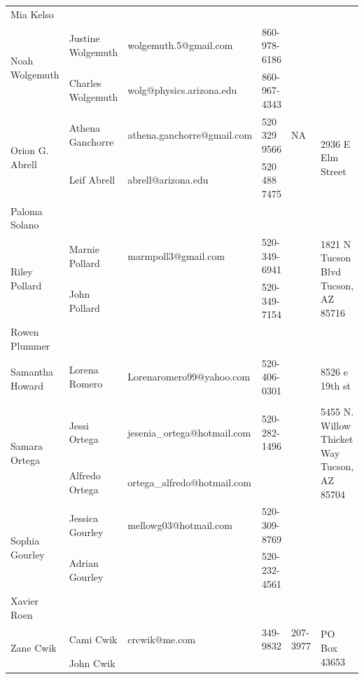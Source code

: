 \documentclass[landscape]{article}\usepackage[]{graphicx}\usepackage[]{color}
\begin{document}
\begin{longtable}{|p{100pt}|p{100pt}|p{140pt}|p{60pt}|p{64pt}|p{120pt}|}
\hline
\multirow{2}{100pt}{Mia Kelso} &  &  &  &  & \multirow{2}{120pt}{} \\
 &  &  &  &  & \\
\hline
\multirow{2}{100pt}{Noah Wolgemuth} & Justine Wolgemuth & wolgemuth.5@gmail.com & 860-978-6186 &  & \multirow{2}{120pt}{} \\
 & Charles Wolgemuth & wolg@physics.arizona.edu & 860-967-4343 &  & \\
\hline
\multirow{2}{100pt}{Orion G. Abrell} & Athena Ganchorre & athena.ganchorre@gmail.com & 520 329 9566 & NA & \multirow{2}{120pt}{2936 E Elm Street} \\
 & Leif Abrell & abrell@arizona.edu & 520 488 7475 &  & \\
\hline
\multirow{2}{100pt}{Paloma Solano} &  &  &  &  & \multirow{2}{120pt}{} \\
 &  &  &  &  & \\
\hline
\multirow{2}{100pt}{Riley Pollard} & Marnie Pollard & marmpoll3@gmail.com & 520-349-6941 &  & \multirow{2}{120pt}{1821 N Tucson Blvd Tucson, AZ 85716} \\
 & John Pollard &  & 520-349-7154 &  & \\
\hline
\multirow{2}{100pt}{Rowen Plummer} &  &  &  &  & \multirow{2}{120pt}{} \\
 &  &  &  &  & \\
\hline
\multirow{2}{100pt}{Samantha Howard} & Lorena Romero  & Lorenaromero99@yahoo.com  & 520-406-0301 &  & \multirow{2}{120pt}{8526 e 19th st} \\
 &  &  &  &  & \\
\hline
\multirow{2}{100pt}{Samara Ortega} & Jessi Ortega & jesenia\_ortega@hotmail.com & 520-282-1496 &  & \multirow{2}{120pt}{5455 N. Willow Thicket Way Tucson, AZ 85704} \\
 & Alfredo Ortega & ortega\_alfredo@hotmail.com &  &  & \\
\hline
\multirow{2}{100pt}{Sophia Gourley} & Jessica Gourley & mellowg03@hotmail.com & 520-309-8769 &  & \multirow{2}{120pt}{} \\
 & Adrian Gourley &  & 520-232-4561 &  & \\
\hline
\multirow{2}{100pt}{Xavier Roen} &  &  &  &  & \multirow{2}{120pt}{} \\
 &  &  &  &  & \\
\hline
\multirow{2}{100pt}{Zane Cwik} & Cami Cwik & crcwik@me.com & 349-9832 & 207-3977 & \multirow{2}{120pt}{PO Box 43653} \\
 & John Cwik  &  &  &  & \\
\hline
\end{longtable}
\newpage
\end{document}
